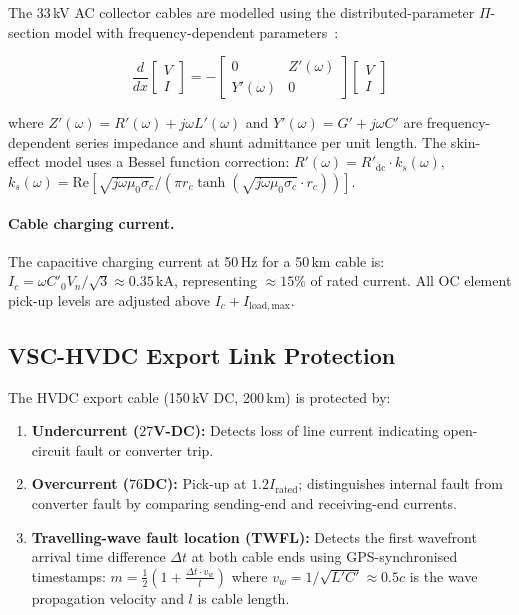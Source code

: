 \documentclass[11pt, a4paper]{article}
\begin{document}
The 33\,kV AC collector cables are modelled using the distributed-parameter
$\Pi$-section model with frequency-dependent parameters~\cite{Mikkelsen2016}:

\begin{equation}
  \frac{d}{dx}\begin{bmatrix}V\\I\end{bmatrix}
  = -\begin{bmatrix}0 & Z'(\omega)\\Y'(\omega) & 0\end{bmatrix}
    \begin{bmatrix}V\\I\end{bmatrix}
  \label{eq:cable}
\end{equation}

\noindent where $Z'(\omega) = R'(\omega) + j\omega L'(\omega)$ and
$Y'(\omega) = G' + j\omega C'$ are frequency-dependent series impedance and
shunt admittance per unit length.
The skin-effect model uses a Bessel function correction:
$R'(\omega) = R'_{\mathrm{dc}} \cdot k_s(\omega)$,
$k_s(\omega) = \mathrm{Re}[\sqrt{j\omega\mu_0\sigma_c}/
(\pi r_c \tanh(\sqrt{j\omega\mu_0\sigma_c}\cdot r_c))]$.

\paragraph{Cable charging current.}
The capacitive charging current at 50\,Hz for a 50\,km cable is:
$I_c = \omega C'_0 V_n / \sqrt{3} \approx 0.35\,\text{kA}$,
representing $\approx 15\%$ of rated current. All OC element pick-up levels
are adjusted above $I_c + I_{\mathrm{load,max}}$.

\subsection{VSC-HVDC Export Link Protection}

The HVDC export cable (150\,kV DC, 200\,km) is protected by:

\begin{enumerate}
  \item \textbf{Undercurrent ($27$V-DC):} Detects loss of line current indicating
    open-circuit fault or converter trip.
  \item \textbf{Overcurrent ($76$DC):} Pick-up at $1.2 I_{\mathrm{rated}}$;
    distinguishes internal fault from converter fault by comparing sending-end
    and receiving-end currents.
  \item \textbf{Travelling-wave fault location (TWFL):}
    Detects the first wavefront arrival time difference $\Delta t$ at both
    cable ends using GPS-synchronised timestamps:
    $m = \frac{1}{2}\left(1 + \frac{\Delta t \cdot v_w}{l}\right)$
    where $v_w = 1/\sqrt{L'C'} \approx 0.5c$ is the wave propagation velocity
    and $l$ is cable length.
\end{enumerate}
\end{document}
